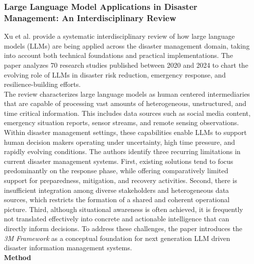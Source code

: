 \subsubsection{Large Language Model Applications in Disaster Management: An Interdisciplinary Review \cite{Xu2025LLMdisaster}}
Xu et al.
provide a systematic interdisciplinary review of how large language models (LLMs) are being applied across the disaster management domain, taking into account both technical foundations and practical implementations.
The paper analyzes 70 research studies published between 2020 and 2024 to chart the evolving role of LLMs in disaster risk reduction, emergency response, and resilience-building efforts.
\\

The review characterizes large language models as human centered intermediaries that are capable of processing vast amounts of heterogeneous, unstructured, and time critical information.
This includes data sources such as social media content, emergency situation reports, sensor streams, and remote sensing observations.
Within disaster management settings, these capabilities enable LLMs to support human decision makers operating under uncertainty, high time pressure, and rapidly evolving conditions.
The authors identify three recurring limitations in current disaster management systems.
First, existing solutions tend to focus predominantly on the response phase, while offering comparatively limited support for preparedness, mitigation, and recovery activities.
Second, there is insufficient integration among diverse stakeholders and heterogeneous data sources, which restricts the formation of a shared and coherent operational picture.
Third, although situational awareness is often achieved, it is frequently not translated effectively into concrete and actionable intelligence that can directly inform decisions.
To address these challenges, the paper introduces the \emph{3M Framework} as a conceptual foundation for next generation LLM driven disaster information management systems.
\\

\textbf{Method}

